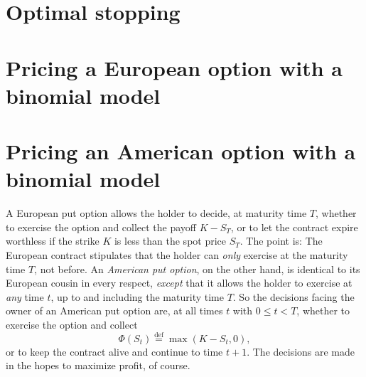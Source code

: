\documentclass[reqno]{amsart}
\theoremstyle{definition}
\numberwithin{equation}{section}
\begin{document}
\section{Optimal stopping}



\section{Pricing a European option with a binomial model}

\section{Pricing an American option with a binomial model}\label{sec:american}

A European put option allows the holder to decide, at maturity time $T$, whether to exercise the option and collect the payoff $K-S_T$, or to let the contract expire worthless if the strike $K$ is less than the spot price $S_T$. The point is: The European contract stipulates that the holder can \textit{only} exercise at the maturity time $T$, not before. An \textit{American put option}, on the other hand, is identical to its European cousin in every respect, \textit{except} that it allows the holder to exercise at \textit{any} time $t$, up to and including the maturity time $T$. So the decisions facing the owner of an American put option are, at all times $t$ with $0 \leq t < T$, whether to exercise the option and collect
	\[
	\Phi(S_t) \stackrel{\text{def}}{=} \max(K-S_t,0),
	\]
or to keep the contract alive and continue to time $t+1$. The decisions are made in the hopes to maximize profit, of course.
\end{document}
